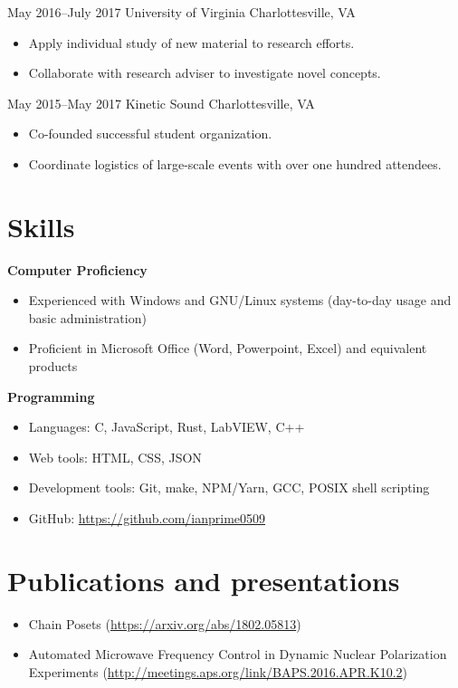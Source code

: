\documentclass[10pt]{article}
\begin{document}
{May 2016--July 2017}
{University of Virginia}
{Charlottesville, VA}
\begin{itemize}
\item Apply individual study of new material to research efforts.
\item Collaborate with research adviser to investigate novel concepts.
\end{itemize}

{May 2015--May 2017}
{Kinetic Sound}
{Charlottesville, VA}
\begin{itemize}
\item Co-founded successful student organization.
\item Coordinate logistics of large-scale events with over one hundred
  attendees.
\end{itemize}

\section*{Skills}
\textbf{Computer Proficiency}
\begin{itemize}
\item Experienced with Windows and GNU/Linux systems (day-to-day usage
  and basic administration)
\item Proficient in Microsoft Office (Word, Powerpoint, Excel) and
  equivalent products
\end{itemize}

\textbf{Programming}
\begin{itemize}
\item Languages: C, JavaScript, Rust, LabVIEW, C++
\item Web tools: HTML, CSS, JSON
\item Development tools: Git, make, NPM/Yarn, GCC, POSIX shell
  scripting
\item GitHub: \url{https://github.com/ianprime0509}
\end{itemize}

\section*{Publications and presentations}
\begin{itemize}
\item Chain Posets (\url{https://arxiv.org/abs/1802.05813})
\item Automated Microwave Frequency Control in Dynamic Nuclear
  Polarization Experiments
  (\url{http://meetings.aps.org/link/BAPS.2016.APR.K10.2})
\end{itemize}
\end{document}
